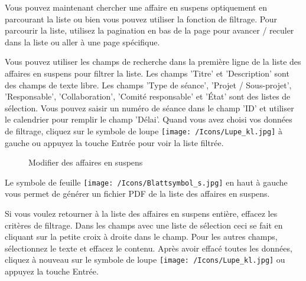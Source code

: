 Vous pouvez maintenant chercher une affaire en suspens optiquement en parcourant la liste ou bien vous pouvez utiliser la fonction de filtrage. Pour parcourir la liste, utilisez la pagination en bas de la page pour avancer / reculer dans la liste ou aller à une page spécifique.

\begin{figure}[H]
\end{figure}

Vous pouvez utiliser les champs de recherche dans la première ligne de la liste des affaires en suspens pour filtrer la liste. Les champs 'Titre' et 'Description' sont des champs de texte libre. Les champs 'Type de séance', 'Projet / Sous-projet', 'Responsable', 'Collaboration', 'Comité responsable' et 'État' sont des listes de sélection. Vous pouvez saisir un numéro de séance dans le champ 'ID' et utiliser le calendrier pour remplir le champ 'Délai'. Quand vous avez choisi vos données de filtrage, cliquez sur le symbole de loupe \texttt{[image: /Icons/Lupe\_kl.jpg]}  à gauche ou appuyez la touche Entrée pour voir la liste filtrée.

\begin{figure}[H]
\caption{Modifier des affaires en suspens}
\end{figure}

Le symbole de feuille \texttt{[image: /Icons/Blattsymbol\_s.jpg]}  en haut à gauche vous permet de générer un fichier PDF de la liste des affaires en suspens.

\vspace{\baselineskip}

Si vous voulez retourner à la liste des affaires en suspens entière, effacez les critères de filtrage. Dans les champs avec une liste de sélection ceci se fait en cliquant sur la petite croix  à droite dans le champ. Pour les autres champs, sélectionnez le texte et effacez le contenu. Après avoir effacé toutes les données, cliquez à nouveau sur le symbole de loupe \texttt{[image: /Icons/Lupe\_kl.jpg]}  ou appuyez la touche Entrée.

